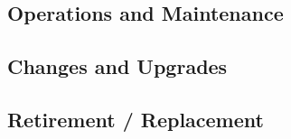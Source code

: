 \subsection{Operations and Maintenance}
\subsection{Changes and Upgrades}
\subsection{Retirement / Replacement}












